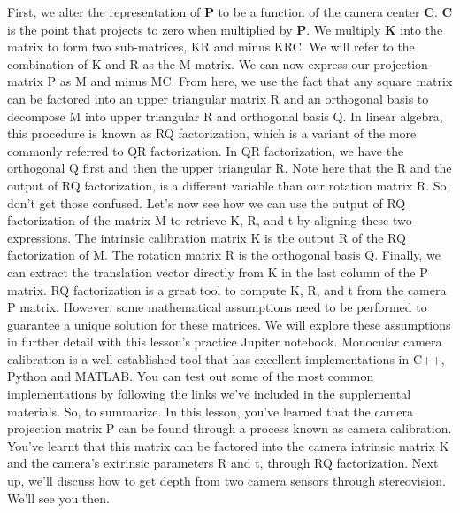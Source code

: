 First, we alter the representation of $\mathbf{P}$ to be a function of
the camera center $\mathbf{C}$. $\mathbf{C}$ is the point that projects to
zero when multiplied by $\mathbf{P}$. We multiply $\mathbf{K}$ into the matrix
to form two sub-matrices, KR and minus KRC. We will refer to the combination of K and R as the M matrix. We can now express our projection matrix P as M and minus MC. From here, we use the fact
that any square matrix can be factored into an upper
triangular matrix R and an orthogonal basis
to decompose M into upper triangular R
and orthogonal basis Q. In linear algebra, this procedure is known as RQ factorization, which is a variant
of the more commonly referred to QR factorization. In QR factorization, we have the orthogonal Q
first and then the upper triangular
R. Note here that the R and the output
of RQ factorization, is a different variable than
our rotation matrix R. So, don't get those confused. Let's now see how we
can use the output of RQ factorization of
the matrix M to retrieve K, R, and t by aligning
these two expressions. The intrinsic calibration matrix
K is the output R of the RQ factorization of M. The rotation matrix R is
the orthogonal basis Q. Finally, we can extract the translation vector
directly from K in the last column
of the P matrix. RQ factorization is
a great tool to compute K, R, and t from
the camera P matrix. However, some mathematical
assumptions need to be performed to guarantee a unique solution
for these matrices. We will explore
these assumptions in further detail with this lesson's practice
Jupiter notebook. Monocular camera calibration is a well-established tool that has excellent implementations
in C++, Python and MATLAB. You can test out some of the most common
implementations by following the links we've included in
the supplemental materials. So, to summarize. In this lesson,
you've learned that the camera projection
matrix P can be found through a process
known as camera calibration. You've learnt that
this matrix can be factored into the
camera intrinsic matrix K and the camera's
extrinsic parameters R and t, through
RQ factorization. Next up, we'll discuss
how to get depth from two camera sensors through stereovision. We'll see you then.